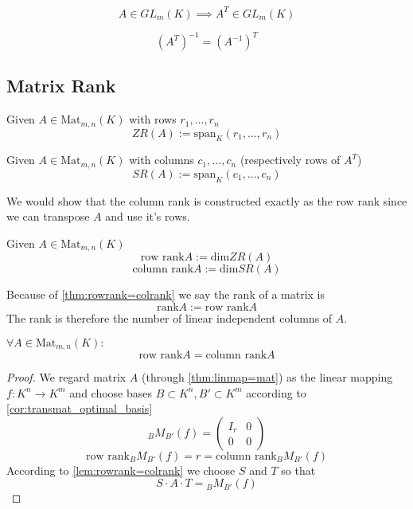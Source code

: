\begin{proposition}
   \[A \in GL_m(K) \implies A^T \in GL_m(K)\]
\end{proposition}

\begin{proposition}
   \[(A^T)^{-1} = (A^{-1})^T\]
\end{proposition}

\subsection{Matrix Rank}
\begin{definition}
   Given \(A \in \text{Mat}_{m,n}(K)\) with rows \(r_1, \ldots, r_n\)
   \[ZR(A) := \text{span}_{K}(r_1, \ldots, r_n)\]
\end{definition}

\begin{definition}
   Given \(A \in \text{Mat}_{m,n}(K)\) with columns \(c_1, \ldots, c_n\) (respectively rows of \(A^T\))
   \[SR(A) := \text{span}_{K}(c_1, \ldots, c_n)\]
\end{definition}
\begin{remark}
   We would show that the column rank is constructed exactly as the row rank since we can transpose \(A\) and use it's rows.
\end{remark}

\begin{definition}
   Given \(A \in \text{Mat}_{m,n}(K)\)
   \[\text{row rank} A := \text{dim} ZR(A)\]
   \[\text{column rank} A := \text{dim} SR(A)\]
\end{definition}
\begin{remark}
   Because of \cref{thm:rowrank=colrank} we say the rank of a matrix is
   \[\text{rank} A := \text{row rank} A\]
   The rank is therefore the number of linear independent columns of \(A\).
\end{remark}

\begin{theorem}\label{thm:rowrank=colrank}
   \(\forall A \in \text{Mat}_{m,n}(K):\)
   \[\text{row rank}A = \text{column rank}A\]
\end{theorem}
\begin{proof}
   We regard matrix \(A\) (through \cref{thm:linmap=mat}) as the linear mapping \(f: K^n \to K^m\) and choose bases \(B \subset K^n, B' \subset K^m\) according to \cref{cor:transmat_optimal_basis}
   \[{}_{B}M_{B'}(f) = \begin{pmatrix}I_r & 0 \\ 0 & 0\end{pmatrix}\]
   \[\text{row rank}{}_{B}M_{B'}(f) = r = \text{column rank}{}_{B}M_{B'}(f)\]
   According to \cref{lem:rowrank=colrank} we choose \(S\) and \(T\) so that
   \[S \cdot A \cdot T = {}_{B}M_{B'}(f)\]
\end{proof}

